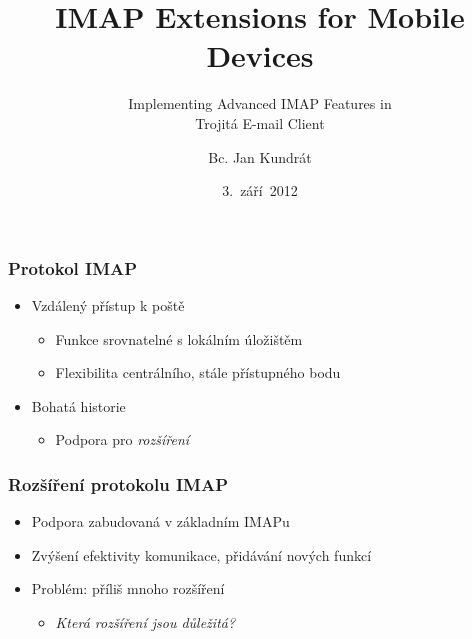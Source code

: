 \documentclass{beamer}
\begin{document}
\title{IMAP Extensions for Mobile Devices}
\subtitle{Implementing Advanced IMAP Features in \\ Trojitá E-mail Client}
\author{Bc. Jan Kundrát}
\date{3.~září~2012}

\begin{frame}
\maketitle
\end{frame}

\begin{frame}[fragile]
  \frametitle{Protokol IMAP}
  \begin{itemize}
    \item Vzdálený přístup k poště
      \begin{itemize}
        \item Funkce srovnatelné s lokálním úložištěm
        \item Flexibilita centrálního, stále přístupného bodu
      \end{itemize}
    \item Bohatá historie
      \begin{itemize}
        \item Podpora pro {\em rozšíření}
      \end{itemize}
  \end{itemize}
\end{frame}

\begin{frame}[fragile]
  \frametitle{Rozšíření protokolu IMAP}
  \begin{itemize}
    \item Podpora zabudovaná v základním IMAPu
    \item Zvýšení efektivity komunikace, přidávání nových funkcí
    \item Problém: příliš mnoho rozšíření
      \begin{itemize}
        \item {\em Která rozšíření jsou důležitá?}
      \end{itemize}
  \end{itemize}
\end{frame}
\end{document}
